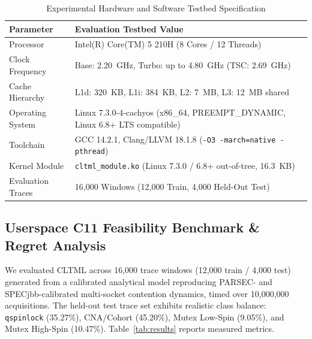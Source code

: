 \documentclass[conference]{IEEEtran}
\begin{document}
\begin{table}[t]
\centering
\caption{Experimental Hardware and Software Testbed Specification}
\label{tab:spec}
\begin{tabular}{ll}
\toprule
\textbf{Parameter} & \textbf{Evaluation Testbed Value} \\
\midrule
Processor & Intel(R) Core(TM) 5 210H (8 Cores / 12 Threads) \\
Clock Frequency & Base: 2.20~GHz, Turbo: up to 4.80~GHz (TSC: 2.69~GHz) \\
Cache Hierarchy & L1d: 320~KB, L1i: 384~KB, L2: 7~MB, L3: 12~MB shared \\
Operating System & Linux 7.3.0-4-cachyos (x86\_64, PREEMPT\_DYNAMIC, Linux 6.8+ LTS compatible) \\
Toolchain & GCC 14.2.1, Clang/LLVM 18.1.8 (\texttt{-O3 -march=native -pthread}) \\
Kernel Module & \texttt{cltml\_module.ko} (Linux 7.3.0 / 6.8+ out-of-tree, 16.3~KB) \\
Evaluation Traces & 16,000 Windows (12,000 Train, 4,000 Held-Out Test) \\
\bottomrule
\end{tabular}
\end{table}

\subsection{Userspace C11 Feasibility Benchmark \& Regret Analysis}
We evaluated CLTML across 16,000 trace windows (12,000 train / 4,000 test) generated from a calibrated analytical model reproducing PARSEC- and SPECjbb-calibrated multi-socket contention dynamics, timed over 10,000,000 acquisitions. The held-out test trace set exhibits realistic class balance: \texttt{qspinlock} (35.27\%), CNA/Cohort (45.20\%), Mutex Low-Spin (9.05\%), and Mutex High-Spin (10.47\%). Table~\ref{tab:results} reports measured metrics.
\end{document}
